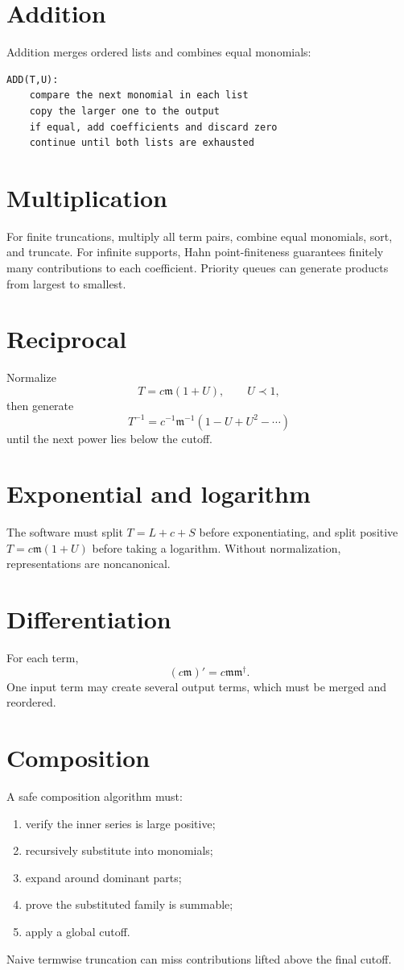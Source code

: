 \documentclass[11pt,oneside,openany]{book}
\newcommand{\mon}{\mathfrak{m}}
\theoremstyle{plain}
\theoremstyle{definition}
\theoremstyle{remark}
\begin{document}
\section{Addition}
Addition merges ordered lists and combines equal monomials:
\begin{verbatim}
ADD(T,U):
    compare the next monomial in each list
    copy the larger one to the output
    if equal, add coefficients and discard zero
    continue until both lists are exhausted
\end{verbatim}

\section{Multiplication}
For finite truncations, multiply all term pairs, combine equal monomials, sort, and truncate. For infinite supports, Hahn point-finiteness guarantees finitely many contributions to each coefficient. Priority queues can generate products from largest to smallest.

\section{Reciprocal}
Normalize
\[
  T=c\mon(1+U),
  \qquad U\prec1,
\]
then generate
\[
  T^{-1}=c^{-1}\mon^{-1}(1-U+U^2-\cdots)
\]
until the next power lies below the cutoff.

\section{Exponential and logarithm}
The software must split $T=L+c+S$ before exponentiating, and split positive $T=c\mon(1+U)$ before taking a logarithm. Without normalization, representations are noncanonical.

\section{Differentiation}
For each term,
\[
  (c\mon)'=c\mon\mon^\dagger.
\]
One input term may create several output terms, which must be merged and reordered.

\section{Composition}
A safe composition algorithm must:
\begin{enumerate}
  \item verify the inner series is large positive;
  \item recursively substitute into monomials;
  \item expand around dominant parts;
  \item prove the substituted family is summable;
  \item apply a global cutoff.
\end{enumerate}
Naive termwise truncation can miss contributions lifted above the final cutoff.
\end{document}
